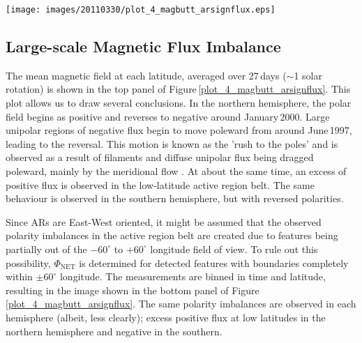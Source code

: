 \documentclass[namedreferences]{solarphysics}
\begin{document}
\begin{article}


\begin{figure*}[!ht]
\sidecaption
\texttt{[image: images/20110330/plot\_4\_magbutt\_arsignflux.eps]}
\caption{\emph{Top}: Magnetic butterfly diagram ($1^{\circ}$ latitude and 27\,day time binning) of mean signed magnetic field. \emph{Bottom}: Total detected magnetic feature $\Phi_{\mathrm{NET}}$ with binning the same as the \emph{top} panel.}
\label{plot_4_magbutt_arsignflux}
\end{figure*}


\subsection{Large-scale Magnetic Flux Imbalance}\label{subsect_imbharm}


The mean magnetic field at each latitude, averaged over 27\,days ($\sim$1 solar rotation) is shown in the top panel of Figure\,\ref{plot_4_magbutt_arsignflux}. This plot allows us to draw several conclusions. In the northern hemisphere, the polar field begins as positive and reverses to negative around January\,2000. Large unipolar regions of negative flux begin to move poleward from around June\,1997, leading to the reversal. This motion is known as the 'rush to the poles' and is observed as a result of filaments \citep{Lockyer:1931,Hyder:1965} and diffuse unipolar flux \citep{Bumba:1965} being dragged poleward, mainly by the meridional flow \citep[][and references therein]{Sheeley:2005}. At about the same time, an excess of positive flux is observed in the low-latitude active region belt. 
The same behaviour is observed in the southern hemisphere, but with reversed polarities.

Since ARs are East-West oriented, it might be assumed that the observed polarity imbalances in the active region belt are created due to features being partially out of the $-60^{\circ}$ to $+60^{\circ}$ longitude field of view. To rule out this possibility, $\Phi_{\mathrm{NET}}$ is determined for detected features with boundaries completely within $\pm60^{\circ}$ longitude. The measurements are binned in time and latitude, resulting in the image shown in the bottom panel of Figure\,\ref{plot_4_magbutt_arsignflux}. The same polarity imbalances are observed in each hemisphere (albeit, less clearly); excess positive flux at low latitudes in the northern hemisphere and negative in the southern.


\end{article}
\end{document}
